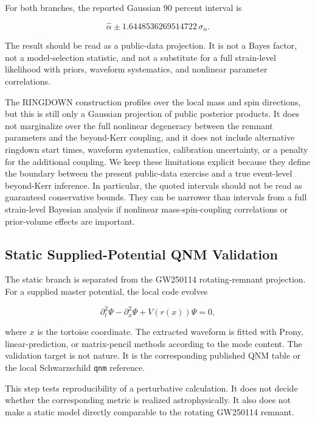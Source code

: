 \documentclass[aps,prd,10pt,twocolumn,nofootinbib,superscriptaddress]{revtex4-2}
\begin{document}
For both branches, the reported Gaussian 90 percent interval is

\begin{equation}
\hat{\alpha}\pm 1.6448536269514722\,\sigma_{\alpha}.
\end{equation}

The result should be read as a public-data projection. It is not a Bayes
factor, not a model-selection statistic, and not a substitute for a full
strain-level likelihood with priors, waveform systematics, and nonlinear
parameter correlations.

The RINGDOWN construction profiles over the local mass and spin directions,
but this is still only a Gaussian projection of public posterior products. It
does not marginalize over the full nonlinear degeneracy between the remnant
parameters and the beyond-Kerr coupling, and it does not include alternative
ringdown start times, waveform systematics, calibration uncertainty, or a
penalty for the additional coupling. We keep these limitations explicit
because they define the boundary between the present public-data exercise and
a true event-level beyond-Kerr inference. In particular, the quoted intervals
should not be read as guaranteed conservative bounds. They can be narrower
than intervals from a full strain-level Bayesian analysis if nonlinear
mass-spin-coupling correlations or prior-volume effects are important.

\subsection{Static Supplied-Potential QNM Validation}

The static branch is separated from the GW250114 rotating-remnant projection.
For a supplied master potential, the local code evolves

\begin{equation}
\partial_t^2\Psi-\partial_x^2\Psi+V(r(x))\Psi=0,
\end{equation}

where $x$ is the tortoise coordinate. The extracted waveform is fitted with
Prony, linear-prediction, or matrix-pencil methods according to the mode
content. The validation target is not nature. It is the corresponding
published QNM table or the local Schwarzschild \texttt{qnm} reference.

This step tests reproducibility of a perturbative calculation. It does not
decide whether the corresponding metric is realized astrophysically. It also
does not make a static model directly comparable to the rotating GW250114
remnant.
\end{document}
